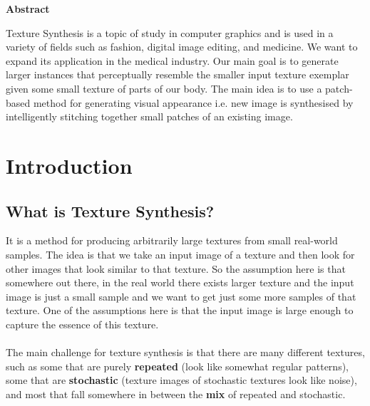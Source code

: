 \documentclass[12pt,a4paper]{report}
\begin{document}
\thispagestyle{empty}

\newpage



\newpage

\begin{center}
  {\Huge \textbf{Abstract}}
\end{center}
\vspace{0.8cm}
Texture Synthesis is a topic of study in computer graphics and is used in a variety of fields such as fashion, digital image editing, and medicine. We want to expand its application in the medical industry. Our main goal is to generate larger instances that perceptually resemble the smaller input texture exemplar given some small texture of parts of our body. The main idea is to use a patch-based method for generating visual appearance i.e. new image is synthesised by intelligently stitching together small patches of an existing image.

\newpage

\tableofcontents

\newpage

\chapter{ Introduction}


\section{What is Texture Synthesis?}
It is a method for producing arbitrarily large textures from small real-world samples. The idea is that we take an input image of a texture and then look for other images that look similar to that texture. So the assumption here is that somewhere out there, in the real world there exists larger texture and the input image is just a small sample and we want to get just some more samples of that texture. One of the assumptions here is that the input image is large enough to capture the essence of this texture.
\\\\
The main challenge for texture synthesis is that there are many different textures, such as some that are purely \textbf{repeated} (look like somewhat regular patterns), some that are \textbf{stochastic} (texture images of stochastic textures look like noise), and most that fall somewhere in between the \textbf{mix} of repeated and stochastic.
\vspace*{0.8cm}
\end{document}
